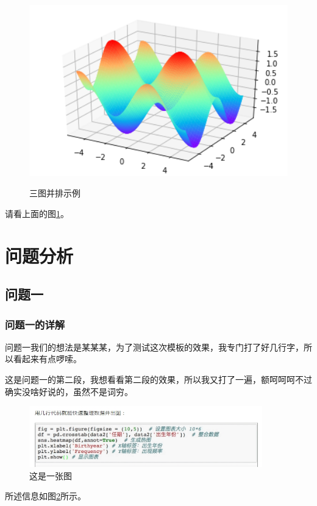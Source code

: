 \documentclass[a4paper,12pt]{ctexart} %
\begin{document}
\begin{figure}[H]
\begin{minipage}[c]{0.3\textwidth}
            \includegraphics[width=1.05\textwidth]{figfour.png}
            \label{fig:sample-figure-c}
        \end{minipage}
        \caption{三图并排示例}
        \label{fig:sample-figure}
    \end{figure}
    
    

    请看上面的图\ref{fig:sample-figure}。
    

    \section{问题分析}
    
    \subsection{问题一}
    \subsubsection{问题一的详解}
    \setlength\parindent{2em} %
    
    
    问题一我们的想法是某某某，为了测试这次模板的效果，我专门打了好几行字，所以看起来有点啰嗦。

    这是问题一的第二段，我想看看第二段的效果，所以我又打了一遍，额呵呵呵不过确实没啥好说的，虽然不是词穷。

    \begin{figure}[!h]
        \centering
        \includegraphics[width=0.90\textwidth]{figone.png}
        \caption{这是一张图}
        \label{fig:thisisafig}
    \end{figure}
    所述信息如图\ref{fig:thisisafig}所示。
\end{document}
